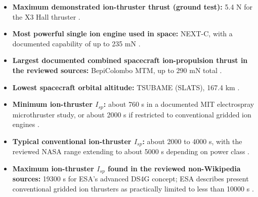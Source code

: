 \documentclass[11pt]{article}
\begin{document}
\begin{itemize}
    \item \textbf{Maximum demonstrated ion-thruster thrust (ground test):} 5.4 N for the X3 Hall thruster \cite{hall2021,peplx3}.
    \item \textbf{Most powerful single ion engine used in space:} NEXT-C, with a documented capability of up to 235 mN \cite{nextc,nextcgwr}.
    \item \textbf{Largest documented combined spacecraft ion-propulsion thrust in the reviewed sources:} BepiColombo MTM, up to 290 mN total \cite{bepifact,esaops}.
    \item \textbf{Lowest spacecraft orbital altitude:} TSUBAME (SLATS), 167.4 km \cite{jaxavariety,tsubamegwr}.
    \item \textbf{Minimum ion-thruster $I_{sp}$:} about 760 s in a documented MIT electrospray microthruster study, or about 2000 s if restricted to conventional gridded ion engines \cite{krejci2017,nasalowpower}.
    \item \textbf{Typical conventional ion-thruster $I_{sp}$:} about 2000 to 4000 s, with the reviewed NASA range extending to about 5000 s depending on power class \cite{nasalowpower,nasahighpower,bit3datasheet,bit3paper}.
    \item \textbf{Maximum ion-thruster $I_{sp}$ found in the reviewed non-Wikipedia sources:} 19300 s for ESA's advanced DS4G concept; ESA describes present conventional gridded ion thrusters as practically limited to less than 10000 s \cite{ds4goverview}.
\end{itemize}
\end{document}
